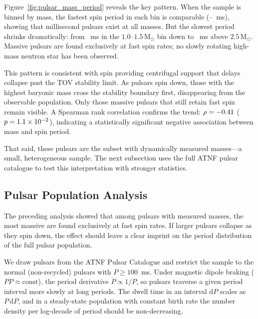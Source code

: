 \documentclass[manuscript,linenumbers]{aastex701}
\newcommand{\Msun}{\mathrm{M}_\odot}
\begin{document}
Figure~\ref{fig:pulsar_mass_period} reveals the key pattern.  When the
sample is binned by mass, the fastest spin period in each bin is
comparable (\pulsarFastestAll--\pulsarFastestSecond~ms), showing that
millisecond pulsars exist at all masses.  But the slowest period
shrinks dramatically: from \pulsarSlowestLow~ms in the
$1.0$--$1.5\,\Msun$ bin down to \pulsarSlowestTop~ms above
$2.5\,\Msun$.  Massive pulsars are found exclusively at fast spin
rates; no slowly rotating high-mass neutron star has been observed.

This pattern is consistent with spin providing centrifugal support
that delays collapse past the TOV stability limit.  As pulsars spin
down, those with the highest baryonic
mass cross the stability boundary first, disappearing from the
observable population.  Only those massive pulsars that still retain
fast spin remain visible.  A Spearman rank correlation confirms the
trend: $\rho = -0.41$ ($p = 1.1 \times 10^{-2}$),
indicating a statistically significant negative association between
mass and spin period.

That said, these \pulsarCount{} pulsars are the subset with
dynamically measured masses---a small, heterogeneous sample.  The
next subsection uses the full ATNF pulsar catalogue to test this
interpretation with stronger statistics.

\subsection{Pulsar Population Analysis}\label{ss:pulsar-population}

The preceding analysis showed that among pulsars with measured masses,
the most massive are found exclusively at fast spin rates.  If larger
pulsars collapse as they spin down, the effect should leave a clear
imprint on the period distribution of the full pulsar population.

We draw \popTotal{} pulsars from the ATNF Pulsar Catalogue
\citep{Manchester2005} and restrict the sample to the \popNormal{}
normal (non-recycled) pulsars with $P \geq 100$~ms.  Under magnetic
dipole braking ($P\dot{P} \approx \text{const}$), the period
derivative $\dot{P} \propto 1/P$, so pulsars traverse a given period
interval more slowly at long periods.  The dwell time in an interval
$\text{d}P$ scales as $P\,\text{d}P$, and in a steady-state population with
constant birth rate the number density per log-decade of period should
be non-decreasing.
\end{document}
